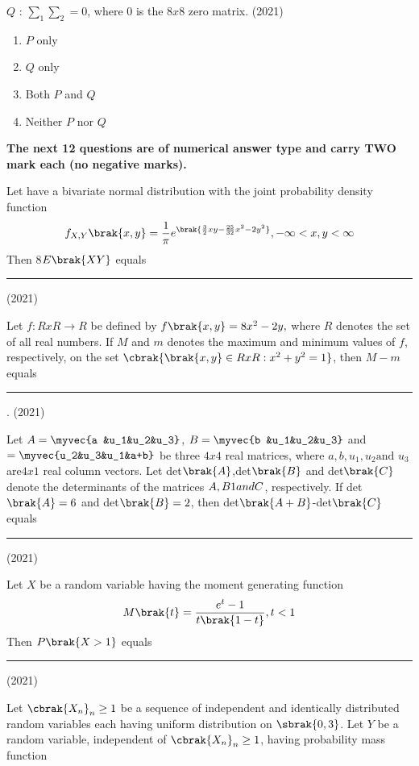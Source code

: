        $Q$ : $\sum_1$$\sum_2=0$, where $0$ is the $8x8$ zero matrix.    
       \hfill{(2021)}
       \begin{enumerate}
           \item $P$ only
           \item $Q$ only 
           \item Both $P$ and $Q$
           \item Neither $P$ nor $Q$
       \end{enumerate}
\textbf{The next 12 questions are of numerical answer type and carry TWO mark each (no negative marks).}
       \item Let  have a bivariate normal distribution with the joint probability density function
            \begin{align*}
                f_{X,Y}\brak{x,y}=\frac{1}{\pi}e^{\brak{\frac{3}{2}xy-\frac{25}{32}x^2-2y^2}},-\infty<x,y<\infty            
            \end{align*}
            Then 8$E\brak{XY}$ equals \rule{1cm}{0.15mm}
            \hfill{(2021)}
       \item Let $f:RxR\rightarrow R$ be defined by $f\brak{x,y}=8x^2-2y,$ where $R$ denotes the set of all real numbers. If $M$ and $m$ denotes the maximum and minimum values of $f$, respectively, on the set $\cbrak{\brak{x,y}\in RxR:x^2 +y^2=1}$, then $M-m$ equals \rule{1cm}{0.15mm} .
       \hfill{(2021)}
	\item Let $A=\myvec{a &u_1&u_2&u_3}$, $B=\myvec{b &u_1&u_2&u_3}$ and $=\myvec{u_2&u_3&u_1&a+b}$ be three $4x4$ real matrices, where $a,b,u_1,u_2 \text{and } u_3$ are$4x1$ real column vectors. Let det$\brak{A}$,det$\brak{B}$ and det$\brak{C}$ denote the determinants of the matrices $A,B \text1{and }C$, respectively. If det$\brak{A}=6$ and det$\brak{B}=2$, then det$\brak{A+B}$-det$\brak{C}$ equals \rule{1cm}{0.15mm}  
	\hfill{(2021)}
       \item Let $X$ be a random variable having the moment generating function 
            \begin{align*}
                M\brak{t}=\frac{e^t-1}{t\brak{1-t}},t<1
            \end{align*}
            Then $P\brak{X>1}$ equals \rule{1cm}{0.15mm} 
            \hfill{(2021)}
	\item  Let $\cbrak{X_n}_n\geq1$ be a sequence of independent and identically distributed random variables each having uniform distribution on $\sbrak{0,3}$. Let $Y$ be a random variable, independent of $\cbrak{X_n}_n\geq1$, having probability mass function 
$$
